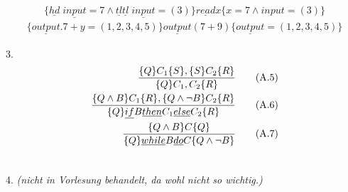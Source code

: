 \begin{compactitem}
\begin{align*}
		\{\underline{hd}\;\underline{input}=7 \land \underline{tl} \underline{tl}\;\underline{input}=(3) \} \underline{read} x \{x=7 \land input=(3)\}
		\end{align*}
		\begin{align*}
		\{\underline{output}.7+y=(1,2,3,4,5)\} \underline{output} (7+9) \{\underline{output} = (1,2,3,4,5)\}
		\end{align*}
	\item[3.]
	\begin{align}
	\frac{\{Q\}C_1\{S\},\{S\}C_2\{R\}}{\{Q\}C_1,C_2\{R\}}\tag{A.5}\\
	\frac{\{Q\land B\}C_1\{R\},\{Q\land \lnot B\}C_2\{R\}}{\{Q\}\underline{if}B\underline{then}C_1\underline{else}C_2\{R\}}\tag{A.6}\\
	\frac{\{Q\land B\}C\{Q\}}{\{Q\}\underline{while}B\underline{do}C\{Q\land \lnot B\}}\tag{A.7}\\
	\notag
	\end{align}
	\item[4.] \emph{(nicht in Vorlesung behandelt, da wohl nicht so wichtig.)}
\end{compactitem}
